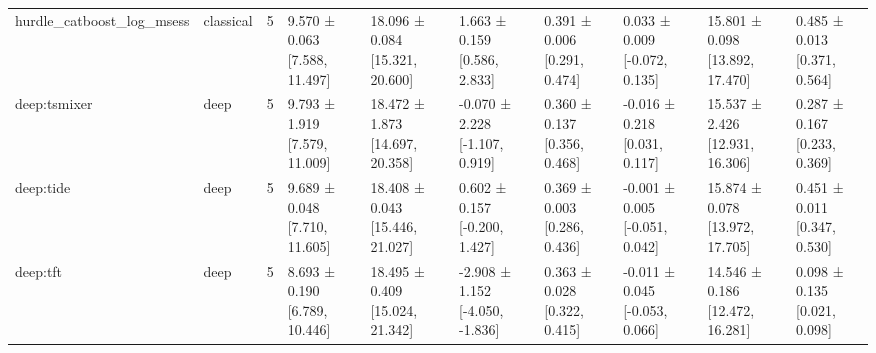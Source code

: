 \begin{table}
\begin{tabular}{llrlllllll}
hurdle\_catboost\_log\_msess & classical & 5 & 9.570 ± 0.063 [7.588, 11.497] & 18.096 ± 0.084 [15.321, 20.600] & 1.663 ± 0.159 [0.586, 2.833] & 0.391 ± 0.006 [0.291, 0.474] & 0.033 ± 0.009 [-0.072, 0.135] & 15.801 ± 0.098 [13.892, 17.470] & 0.485 ± 0.013 [0.371, 0.564] \\
deep:tsmixer & deep & 5 & 9.793 ± 1.919 [7.579, 11.009] & 18.472 ± 1.873 [14.697, 20.358] & -0.070 ± 2.228 [-1.107, 0.919] & 0.360 ± 0.137 [0.356, 0.468] & -0.016 ± 0.218 [0.031, 0.117] & 15.537 ± 2.426 [12.931, 16.306] & 0.287 ± 0.167 [0.233, 0.369] \\
deep:tide & deep & 5 & 9.689 ± 0.048 [7.710, 11.605] & 18.408 ± 0.043 [15.446, 21.027] & 0.602 ± 0.157 [-0.200, 1.427] & 0.369 ± 0.003 [0.286, 0.436] & -0.001 ± 0.005 [-0.051, 0.042] & 15.874 ± 0.078 [13.972, 17.705] & 0.451 ± 0.011 [0.347, 0.530] \\
deep:tft & deep & 5 & 8.693 ± 0.190 [6.789, 10.446] & 18.495 ± 0.409 [15.024, 21.342] & -2.908 ± 1.152 [-4.050, -1.836] & 0.363 ± 0.028 [0.322, 0.415] & -0.011 ± 0.045 [-0.053, 0.066] & 14.546 ± 0.186 [12.472, 16.281] & 0.098 ± 0.135 [0.021, 0.098] \\
\bottomrule
\end{tabular}
\end{table}
